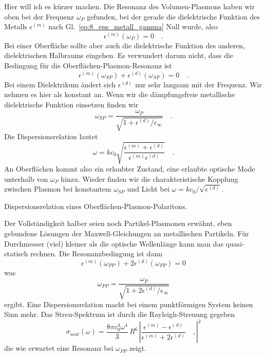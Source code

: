 Hier will ich es kürzer machen. Die Resonanz des Volumen-Plasmons haben wir oben bei der Frequenz $\omega_P$ gefunden, bei der gerade die dielektrische Funktion des Metalls $ \epsilon^{(m)}$ nach Gl.~\ref{eq:8_eps_metall_gamma} Null wurde, also 
\begin{equation}
    \epsilon^{(m)}(\omega_P) = 0 \quad .
\end{equation}
Bei einer Oberfläche sollte aber auch die dielektrische Funktion des anderen, dielektrischen Halbraums eingehen. Es verwundert darum nicht, dass die Bedingung für die Oberflächen-Plasmon-Resonanz ist
\begin{equation}
    \epsilon^{(m)}(\omega_{SP}) +  \epsilon^{(d)}(\omega_{SP}) = 0 \quad .
\end{equation}
Bei einem Dielektrikum ändert sich $\epsilon^{(d)}$ nur sehr langsam mit der Frequenz. Wir nehmen es hier als konstant an.
Wenn wir die dämpfungsfreie metallische dielektrische Funktion einsetzen finden wir
\begin{equation}
   \omega_{SP} = \frac{\omega_P}{\sqrt{1 + \epsilon^{(d)} / \epsilon_\infty }} \quad .
\end{equation}
Die Dispersionsrelation lautet
\begin{equation}
    \omega = k c_0 \sqrt{ \frac{\epsilon^{(m)}  + \epsilon^{(d)}} {\epsilon^{(m)} \epsilon^{(d)}} }  \quad .
\end{equation}
An Oberflächen kommt also ein erlaubter Zustand, eine erlaubte optische Mode unterhalb von $\omega_P$ hinzu. Wieder finden wir die charakteristische Kopplung zwischen Plasmon bei konstantem $ \omega_{SP} $ und Licht bei $\omega = k c_0 / \sqrt{\epsilon^{(d)}}$.

\begin{marginfigure}
    \caption{Dispersionsrelation eines Oberflächen-Plasmon-Polaritons.}
\end{marginfigure}

Der Vollständigkeit halber seien noch Partikel-Plasmonen erwähnt, eben gebundene Lösungen der Maxwell-Gleichungen an metallischen Partikeln. Für Durchmesser (viel) kleiner als die optische Wellenlänge kann man das quasi-statisch rechnen. Die Resonanzbedingung ist dann 
\begin{equation}
    \epsilon^{(m)}(\omega_{PP}) + 2 \epsilon^{(d)}(\omega_{PP}) = 0
\end{equation}
was
\begin{equation}
    \omega_{PP} = \frac{\omega_P}{\sqrt{1 + 2 \epsilon^{(d)}  / \epsilon_\infty} }
 \end{equation}
ergibt. Eine Dispersionsrelation macht bei einem punktförmigen System keinen Sinn mehr. Das Streu-Spektrum ist durch die Rayleigh-Streuung gegeben
\begin{equation}
    \sigma_{scat}(\omega) = \frac{8 \pi c_0^4 \omega^4}{3} \,  R^6  \,
    \left|
        \frac{\epsilon^{(m)}  - \epsilon^{(d)}} {\epsilon^{(m)} + 2\epsilon^{(d)} }  \quad ,
    \right|^2
\end{equation}
die wie erwartet eine Resonanz bei $\omega_{PP}$ zeigt.



